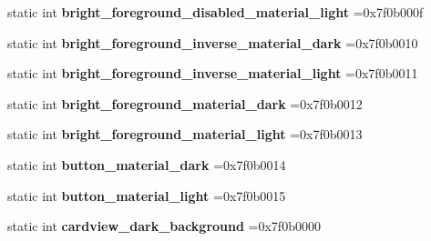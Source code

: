 \begin{DoxyCompactItemize}
static int {\bfseries bright\+\_\+foreground\+\_\+disabled\+\_\+material\+\_\+light} =0x7f0b000f
\item 
\mbox{\label{classandroid_1_1support_1_1v7_1_1cardview_1_1R_1_1color_a276cb1b6d59ac604833d3235e90aca07}} 
static int {\bfseries bright\+\_\+foreground\+\_\+inverse\+\_\+material\+\_\+dark} =0x7f0b0010
\item 
\mbox{\label{classandroid_1_1support_1_1v7_1_1cardview_1_1R_1_1color_ab7eb0c19903a9a5736f807af46934aaa}} 
static int {\bfseries bright\+\_\+foreground\+\_\+inverse\+\_\+material\+\_\+light} =0x7f0b0011
\item 
\mbox{\label{classandroid_1_1support_1_1v7_1_1cardview_1_1R_1_1color_acd225234cef4c9f677ce8f4666050cd4}} 
static int {\bfseries bright\+\_\+foreground\+\_\+material\+\_\+dark} =0x7f0b0012
\item 
\mbox{\label{classandroid_1_1support_1_1v7_1_1cardview_1_1R_1_1color_ae1cc72884aa669f7a9b214e87d365a06}} 
static int {\bfseries bright\+\_\+foreground\+\_\+material\+\_\+light} =0x7f0b0013
\item 
\mbox{\label{classandroid_1_1support_1_1v7_1_1cardview_1_1R_1_1color_a942f3bab68c3293b0b0a20a0ee61e4ab}} 
static int {\bfseries button\+\_\+material\+\_\+dark} =0x7f0b0014
\item 
\mbox{\label{classandroid_1_1support_1_1v7_1_1cardview_1_1R_1_1color_a35df1f7b2f0721fb008faca6623aed3a}} 
static int {\bfseries button\+\_\+material\+\_\+light} =0x7f0b0015
\item 
\mbox{\label{classandroid_1_1support_1_1v7_1_1cardview_1_1R_1_1color_ab2c3756ca435e92f9a6a4ed236fd5d72}} 
static int {\bfseries cardview\+\_\+dark\+\_\+background} =0x7f0b0000
\item 
\mbox{\label{classandroid_1_1support_1_1v7_1_1cardview_1_1R_1_1color_a7af75d630cc0ce772fcc797dec3e4bcf}} 

\end{DoxyCompactItemize}
